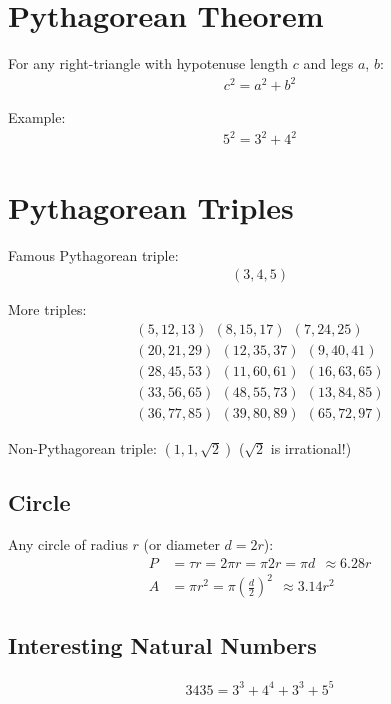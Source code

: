 \documentclass[12pt]{article}
\begin{document}
\section*{Pythagorean Theorem}
For any right-triangle with hypotenuse length $c$ and legs $a$, $b$:
\begin{align*}
c^2 = a^2 + b^2 
\end{align*}

\noindent Example: \vspace{-0.5em}
\begin{align*}
5^2 = 3^2 + 4^2 
\end{align*}

\section*{Pythagorean Triples}
Famous Pythagorean triple: 
\begin{align*}
(3, 4, 5)
\end{align*}

\noindent More triples:
\begin{align*}
(5, 12, 13)~~
(8, 15, 17)~~
(7, 24, 25)\\
(20, 21, 29)~~	
(12, 35, 37)~~	
(9, 40, 41)\\ 	
(28, 45, 53)~~
(11, 60, 61)~~ 
(16, 63, 65)\\
(33, 56, 65)~~ 	
(48, 55, 73)~~
(13, 84, 85)\\
(36, 77, 85)~~
(39, 80, 89)~~
(65, 72, 97) 
\end{align*}

\noindent Non-Pythagorean triple: $(1,1,\sqrt{2})$  ($\sqrt{2}$ is irrational!)

\subsection*{Circle}
Any circle of radius $r$ (or diameter $d = 2r$):
\begin{align*}
P & = \tau r = 2\pi r = \pi 2 r = \pi d ~~ \approx 6.28 r\\
A & = \pi r^2 = \pi \left(\frac{d}{2}\right)^2 ~~ \approx 3.14 r^2 
\end{align*}


\subsection*{Interesting Natural Numbers}
\begin{align*}
3435 = 3^{3} + 4^{4} + 3^{3} + 5^{5}
\end{align*}
\end{document}
